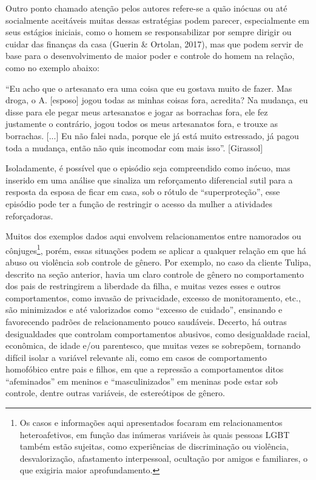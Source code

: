 Outro ponto chamado atenção pelos autores refere-se a quão inócuas ou até socialmente aceitáveis muitas dessas estratégias podem parecer, especialmente em seus estágios iniciais, como o homem se responsabilizar por sempre dirigir ou cuidar das finanças da casa (Guerin \& Ortolan, 2017), mas que podem servir de base para o desenvolvimento de maior poder e controle do homem na relação, como no exemplo abaixo:

``Eu acho que o artesanato era uma coisa que eu gostava muito de fazer. Mas droga, o A. [esposo] jogou todas as minhas coisas fora, acredita? Na mudança, eu disse para ele pegar meus artesanatos e jogar as borrachas fora, ele fez justamente o contrário, jogou todos os meus artesanatos fora, e trouxe as borrachas. [...] Eu não falei nada, porque ele já está muito estressado, já pagou toda a mudança, então não quis incomodar com mais isso''. [Girassol]

Isoladamente, é possível que o episódio seja compreendido como inócuo, mas inserido em uma análise que sinaliza um reforçamento diferencial sutil para a resposta da esposa de ficar em casa, sob o rótulo de ``superproteção'', esse episódio pode ter a função de restringir o acesso da mulher a atividades reforçadoras.

Muitos dos exemplos dados aqui envolvem relacionamentos entre namorados ou cônjuges\footnote{Os casos e informações aqui apresentados focaram em relacionamentos heteroafetivos, em função das inúmeras variáveis às quais pessoas LGBT também estão sujeitas, como experiências de discriminação ou violência, desvalorização, afastamento interpessoal, ocultação por amigos e familiares, o que exigiria maior aprofundamento.}, porém, essas situações podem se aplicar a qualquer relação em que há abuso ou violência sob controle de gênero. Por exemplo, no caso da cliente Tulipa, descrito na seção anterior, havia um claro controle de gênero no comportamento dos pais de restringirem a liberdade da filha, e muitas vezes esses e outros comportamentos, como invasão de privacidade, excesso de monitoramento, etc., são minimizados e até valorizados como ``excesso de cuidado'', ensinando e favorecendo padrões de relacionamento pouco saudáveis. Decerto, há outras desigualdades que controlam comportamentos abusivos, como desigualdade racial, econômica, de idade e/ou parentesco, que muitas vezes se sobrepõem, tornando difícil isolar a variável relevante ali, como em casos de comportamento homofóbico entre pais e filhos, em que a repressão a comportamentos ditos ``afeminados'' em meninos e ``masculinizados'' em meninas pode estar sob controle, dentre outras variáveis, de estereótipos de gênero.

